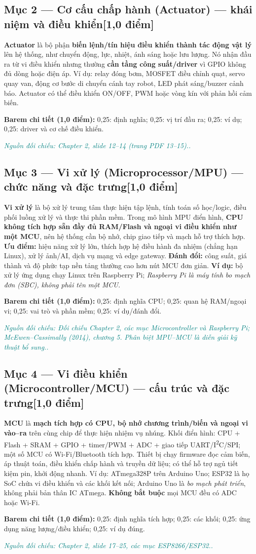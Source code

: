 \documentclass[11pt,a4paper]{article}
\newcommand{\pointpart}[2]{\subsection*{Mục #1 --- #2\hfill\normalsize\color{teal}[1,0 điểm]}}
\newcommand{\src}[1]{\par\noindent\textcolor{teal}{\footnotesize\textit{Nguồn đối chiếu: #1.}}\par}
\newcommand{\scoring}[1]{\par\noindent\textbf{Barem chi tiết (1,0 điểm):} #1\par}
\newcommand{\kw}[1]{\textbf{#1}}
\begin{document}
\pointpart{2}{Cơ cấu chấp hành (Actuator) --- khái niệm và điều khiển}
\kw{Actuator} là bộ phận \kw{biến lệnh/tín hiệu điều khiển thành tác động vật lý} lên hệ thống, như chuyển động, lực, nhiệt, ánh sáng hoặc lưu lượng. Nó nhận đầu ra từ vi điều khiển nhưng thường \kw{cần tầng công suất/driver} vì GPIO không đủ dòng hoặc điện áp. Ví dụ: relay đóng bơm, MOSFET điều chỉnh quạt, servo quay van, động cơ bước di chuyển cánh tay robot, LED phát sáng/buzzer cảnh báo. Actuator có thể điều khiển ON/OFF, PWM hoặc vòng kín với phản hồi cảm biến.
\scoring{0,25: định nghĩa; 0,25: vị trí đầu ra; 0,25: ví dụ; 0,25: driver và cơ chế điều khiển.}
\src{Chapter 2, slide 12--14 (trang PDF 13--15).}

\pointpart{3}{Vi xử lý (Microprocessor/MPU) --- chức năng và đặc trưng}
\kw{Vi xử lý} là bộ xử lý trung tâm thực hiện tập lệnh, tính toán số học/logic, điều phối luồng xử lý và thực thi phần mềm. Trong mô hình MPU điển hình, \kw{CPU không tích hợp sẵn đầy đủ RAM/Flash và ngoại vi điều khiển như một MCU}, nên hệ thống cần bộ nhớ, chip giao tiếp và mạch hỗ trợ thích hợp. \kw{Ưu điểm:} hiệu năng xử lý lớn, thích hợp hệ điều hành đa nhiệm (chẳng hạn Linux), xử lý ảnh/AI, dịch vụ mạng và edge gateway. \kw{Đánh đổi:} công suất, giá thành và độ phức tạp nền tảng thường cao hơn nút MCU đơn giản. \kw{Ví dụ:} bộ xử lý ứng dụng chạy Linux trên Raspberry Pi; \emph{Raspberry Pi là máy tính bo mạch đơn (SBC), không phải tên một MCU}.
\scoring{0,25: định nghĩa CPU; 0,25: quan hệ RAM/ngoại vi; 0,25: vai trò và phần mềm; 0,25: ví dụ/đánh đổi.}
\src{Đối chiếu Chapter 2, các mục Microcontroller và Raspberry Pi; McEwen--Cassimally (2014), chương 5. Phân biệt MPU--MCU là diễn giải kỹ thuật bổ sung.}

\pointpart{4}{Vi điều khiển (Microcontroller/MCU) --- cấu trúc và đặc trưng}
\kw{MCU} là \kw{mạch tích hợp có CPU, bộ nhớ chương trình/biến và ngoại vi vào--ra} trên cùng chip để thực hiện nhiệm vụ nhúng. Khối điển hình: CPU + Flash + SRAM + GPIO + timer/PWM + ADC + giao tiếp UART/I\textsuperscript{2}C/SPI; một số MCU có Wi-Fi/Bluetooth tích hợp. Thiết bị chạy firmware đọc cảm biến, áp thuật toán, điều khiển chấp hành và truyền dữ liệu; có thể hỗ trợ ngủ tiết kiệm pin, khởi động nhanh. Ví dụ: ATmega328P trên Arduino Uno; ESP32 là họ SoC chứa vi điều khiển và các khối kết nối; Arduino Uno là \emph{bo mạch phát triển}, không phải bản thân IC ATmega. \kw{Không bắt buộc} mọi MCU đều có ADC hoặc Wi-Fi.
\scoring{0,25: định nghĩa tích hợp; 0,25: các khối; 0,25: ứng dụng năng lượng/điều khiển; 0,25: ví dụ đúng.}
\src{Chapter 2, slide 17--25, các mục ESP8266/ESP32.}
\end{document}
